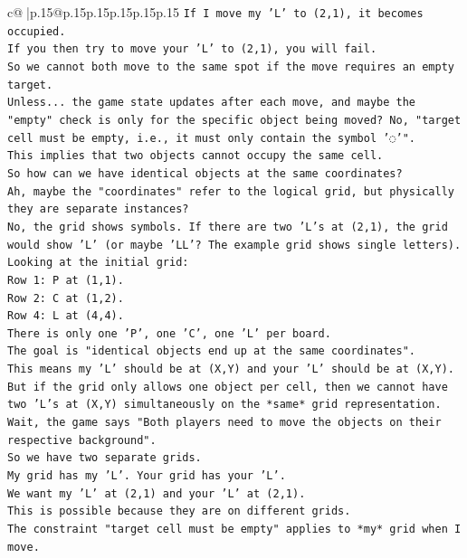 \documentclass{article}
\begin{document}
{\begin{supertabular}{c@{$\;$}|p{.15\linewidth}@{}p{.15\linewidth}p{.15\linewidth}p{.15\linewidth}p{.15\linewidth}p{.15\linewidth}}
{{{\texttt{If I move my 'L' to (2,1), it becomes occupied.} \\
\texttt{If you then try to move your 'L' to (2,1), you will fail.} \\
\texttt{So we cannot both move to the same spot if the move requires an empty target.} \\
\texttt{Unless... the game state updates after each move, and maybe the "empty" check is only for the specific object being moved? No, "target cell must be empty, i.e., it must only contain the symbol '◌'".} \\
\texttt{This implies that two objects cannot occupy the same cell.} \\
\texttt{So how can we have identical objects at the same coordinates?} \\
\texttt{Ah, maybe the "coordinates" refer to the logical grid, but physically they are separate instances?} \\
\texttt{No, the grid shows symbols. If there are two 'L's at (2,1), the grid would show 'L' (or maybe 'LL'? The example grid shows single letters).} \\
\texttt{Looking at the initial grid:} \\
\texttt{Row 1: P at (1,1).} \\
\texttt{Row 2: C at (1,2).} \\
\texttt{Row 4: L at (4,4).} \\
\texttt{There is only one 'P', one 'C', one 'L' per board.} \\
\texttt{The goal is "identical objects end up at the same coordinates".} \\
\texttt{This means my 'L' should be at (X,Y) and your 'L' should be at (X,Y).} \\
\texttt{But if the grid only allows one object per cell, then we cannot have two 'L's at (X,Y) simultaneously on the *same* grid representation.} \\
\texttt{Wait, the game says "Both players need to move the objects on their respective background".} \\
\texttt{So we have two separate grids.} \\
\texttt{My grid has my 'L'. Your grid has your 'L'.} \\
\texttt{We want my 'L' at (2,1) and your 'L' at (2,1).} \\
\texttt{This is possible because they are on different grids.} \\
\texttt{The constraint "target cell must be empty" applies to *my* grid when I move.} \\
}}}
\end{supertabular}}
\end{document}
